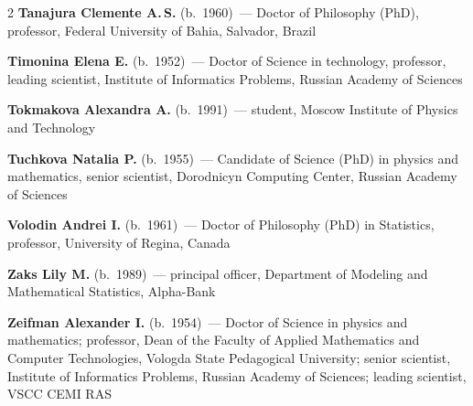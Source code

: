 \begin{multicols}{2}
\noindent
\textbf{Tanajura Clemente A.\,S.}  (b.\ 1960)~--- Doctor of Philosophy (PhD), professor, 
Federal University of Bahia, Salvador, Brazil

\vspace*{4pt}

\noindent
\textbf{Timonina Elena E.} (b.\ 1952)~--- Doctor of Science in technology, professor,
leading scientist, Institute of Informatics Problems,  Russian Academy of Sciences

\vspace*{4pt}

\noindent
\textbf{Tokmakova Alexandra A.} (b.\ 1991)~--- student, Moscow Institute of
Physics and Technology

\columnbreak

\noindent
\textbf{Tuchkova Natalia P.} (b.\ 1955)~--- Candidate of Science (PhD) 
in physics and mathematics, senior scientist, Dorodnicyn Computing Center, 
Russian Academy of Sciences

\vspace*{4pt}

\noindent
\textbf{Volodin Andrei I.} (b.\ 1961)~--- Doctor of Philosophy (PhD)
in Statistics, professor, University of Regina, Canada


\vspace*{4pt}


\noindent
\textbf{Zaks Lily M.} (b.\ 1989)~--- principal officer, Department of Modeling and 
Mathematical Statistics, Alpha-Bank


\vspace*{4pt}

\noindent
\textbf{Zeifman Alexander I.} (b.\ 1954)~--- Doctor of Science in physics 
and mathematics; professor, Dean of the Faculty of Applied Mathematics and Computer Technologies,
Vologda State Pedagogical University; senior scientist,
Institute of Informatics Problems, Russian Academy of Sciences;
leading scientist, VSCC CEMI RAS  



\def\leftfootline{\small{\textbf{\thepage}
\hfill ����������� � �� ����������\ \ \ ⮬~6\ \ \ ����~4\ \ \ 2012}
}%
 \def\rightfootline{\small{����������� � �� ����������\ \ \ ⮬~6\ \ \ ����~4\ \ \ 2012
\hfill \textbf{\thepage}}}



\end{multicols}
\newpage
